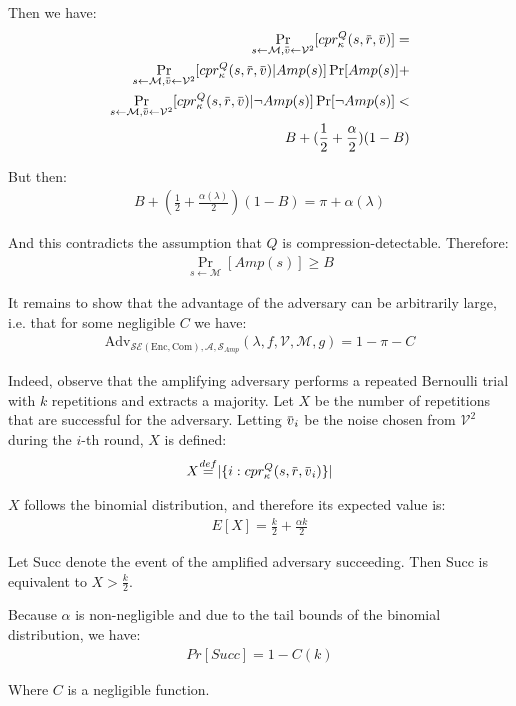 \documentclass[conference, letterpaper, 10pt]{IEEEtran}
\newcommand\defeq{\stackrel{\mathclap{\normalfont\mbox{def}}}{=}}
\newcommand{\overbar}[1]{\mkern 1.5mu\overline{\mkern-1.5mu#1\mkern-1.5mu}\mkern 1.5mu}
\begin{document}
\begin{IEEEproof}
Then we have:
\begin{align*}
    \Pr_{s \leftarrow \mathcal{M},
         \overbar{v} \leftarrow \mathcal{V}^2}
         [cpr^Q_{\kappa}(s, \overbar{r}, \overbar{v})]
    =\\
    \Pr_{s \leftarrow \mathcal{M},
         \overbar{v} \leftarrow \mathcal{V}^2}
         [cpr^Q_{\kappa}(s, \overbar{r}, \overbar{v})|Amp(s)]\Pr[Amp(s)]
    +\\
    \Pr_{s \leftarrow \mathcal{M},
         \overbar{v} \leftarrow \mathcal{V}^2}
         [cpr^Q_{\kappa}(s, \overbar{r}, \overbar{v})|\lnot Amp(s)]\Pr[\lnot Amp(s)]
    <\\
    B + (\frac{1}{2} + \frac{\alpha}{2})(1 - B)
\end{align*}

But then:
\begin{align*}
    B + (\frac{1}{2} + \frac{\alpha(\lambda)}{2})(1 - B) =
    \pi + \alpha(\lambda)
\end{align*}

And this contradicts the assumption that $Q$ is compression-detectable. Therefore:
\begin{align*}
    \Pr_{s \leftarrow \mathcal{M}}
    [Amp(s)] \geq B
\end{align*}

It remains to show that the advantage of the adversary can be
arbitrarily large, i.e. that for some negligible $C$ we have:
\begin{align*}
    \text{Adv}_{\mathcal{SE}(\textrm{Enc}, \textrm{Com}), \mathcal{A}, \mathcal{S}_{Amp}}
    (\lambda, f, \mathcal{V}, \mathcal{M}, g) = 1 - \pi - C
\end{align*}

Indeed, observe that the amplifying adversary performs a repeated Bernoulli
trial with $k$ repetitions and extracts a majority. Let $X$ be the number of
repetitions that are successful for the adversary. Letting $\overbar{v}_i$
be the noise chosen from $\mathcal{V}^2$ during the $i$-th round, $X$ is defined:
\begin{align*}
    X \defeq |\{ i: cpr^Q_{\kappa}(s, \overbar{r}, \overbar{v}_i) \}|
\end{align*}

$X$ follows the binomial distribution, and therefore its expected value is:
\begin{align*}
    E[X] = \frac{k}{2} + \frac{\alpha k}{2}
\end{align*}

Let Succ denote the event of the amplified adversary succeeding. Then Succ
is equivalent to $X > \frac{k}{2}$.

Because $\alpha$ is non-negligible and due to the tail bounds of the binomial
distribution, we have:
\begin{align*}
    Pr[Succ] = 1 - C(k)
\end{align*}

Where $C$ is a negligible function.
\end{IEEEproof}
\end{document}
